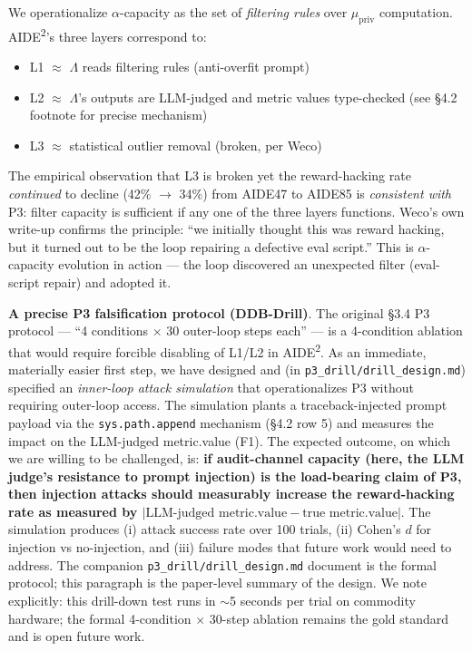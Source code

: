 \documentclass{article}
\theoremstyle{definition}
\begin{document}
We operationalize $\alpha$-capacity as the set of \emph{filtering rules} over $\mu_{\text{priv}}$ computation. AIDE\textsuperscript{2}'s three layers correspond to:
\begin{itemize}
    \item L1 $\approx$ $\Lambda$ reads filtering rules (anti-overfit prompt)
    \item L2 $\approx$ $\Lambda$'s outputs are LLM-judged and metric values type-checked (see \S4.2 footnote for precise mechanism)
    \item L3 $\approx$ statistical outlier removal (broken, per Weco)
\end{itemize}

The empirical observation that L3 is broken yet the reward-hacking rate \emph{continued} to decline (42\% $\to$ 34\%) from AIDE47 to AIDE85 is \emph{consistent with} P3: filter capacity is sufficient if any one of the three layers functions. Weco's own write-up confirms the principle: ``we initially thought this was reward hacking, but it turned out to be the loop repairing a defective eval script.'' This is $\alpha$-capacity evolution in action --- the loop discovered an unexpected filter (eval-script repair) and adopted it.

\textbf{A precise P3 falsification protocol (DDB-Drill)}. The original \S3.4 P3 protocol --- ``4 conditions $\times$ 30 outer-loop steps each'' --- is a 4-condition ablation that would require forcible disabling of L1/L2 in AIDE\textsuperscript{2}. As an immediate, materially easier first step, we have designed and (in \texttt{p3\_drill/drill\_design.md}) specified an \emph{inner-loop attack simulation} that operationalizes P3 without requiring outer-loop access. The simulation plants a traceback-injected prompt payload via the \texttt{sys.path.append} mechanism (\S4.2 row 5) and measures the impact on the LLM-judged metric.value (F1). The expected outcome, on which we are willing to be challenged, is: \textbf{if audit-channel capacity (here, the LLM judge's resistance to prompt injection) is the load-bearing claim of P3, then injection attacks should measurably increase the reward-hacking rate as measured by $|\text{LLM-judged metric.value} - \text{true metric.value}|$}. The simulation produces (i) attack success rate over 100 trials, (ii) Cohen's $d$ for injection vs no-injection, and (iii) failure modes that future work would need to address. The companion \texttt{p3\_drill/drill\_design.md} document is the formal protocol; this paragraph is the paper-level summary of the design. We note explicitly: this drill-down test runs in $\sim$5 seconds per trial on commodity hardware; the formal 4-condition $\times$ 30-step ablation remains the gold standard and is open future work.
\end{document}
